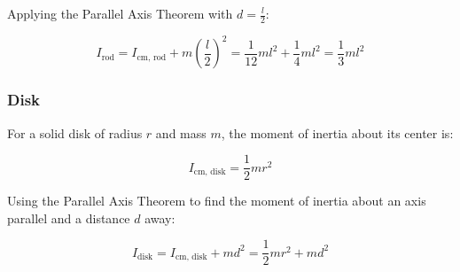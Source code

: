 Applying the Parallel Axis Theorem with \(d = \frac{l}{2}\):

\begin{equation}
\label{eq:rod_total_inertia}
I_{\text{rod}} = I_{\text{cm, rod}} + m\left(\frac{l}{2}\right)^2 = \frac{1}{12}ml^2 + \frac{1}{4}ml^2 = \frac{1}{3}ml^2
\end{equation}

\subsubsection{Disk}
For a solid disk of radius \(r\) and mass \(m\), the moment of inertia about its center is:

\begin{equation}
\label{eq:disk_cm_inertia}
I_{\text{cm, disk}} = \frac{1}{2}mr^2
\end{equation}

Using the Parallel Axis Theorem to find the moment of inertia about an axis parallel and a distance \(d\) away:

\begin{equation}
\label{eq:disk_total_inertia}
I_{\text{disk}} = I_{\text{cm, disk}} + md^2 = \frac{1}{2}mr^2 + md^2
\end{equation}




